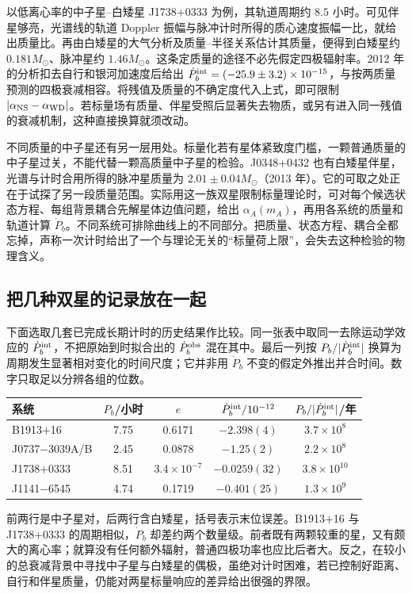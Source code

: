 以低离心率的中子星--白矮星 J1738+0333 为例，其轨道周期约 $8.5$ 小时。可见伴星够亮，光谱线的轨道 Doppler 振幅与脉冲计时所得的质心速度振幅一比，就给出质量比。再由白矮星的大气分析及质量--半径关系估计其质量，便得到白矮星约 $0.181M_\odot$、脉冲星约 $1.46M_\odot$。这条定质量的途径不必先假定四极辐射率。2012 年的分析扣去自行和银河加速度后给出 $\dot P_b^{\rm int}=(-25.9\pm3.2)\times10^{-15}$，与按两质量预测的四极衰减相容。将残值及质量的不确定度代入上式，即可限制 $|\alpha_{\rm NS}-\alpha_{\rm WD}|$。若标量场有质量、伴星受照后显著失去物质，或另有进入同一残值的衰减机制，这种直接换算就须改动。

不同质量的中子星还有另一层用处。标量化若有星体紧致度门槛，一颗普通质量的中子星过关，不能代替一颗高质量中子星的检验。J0348+0432 也有白矮星伴星，光谱与计时合用所得的脉冲星质量为 $2.01\pm0.04M_\odot$（2013 年）。它的可取之处正在于试探了另一段质量范围。实际用这一族双星限制标量理论时，可对每个候选状态方程、每组背景耦合先解星体边值问题，给出 $\alpha_A(m_A)$，再用各系统的质量和轨道计算 $\dot P_b$。不同系统可排除曲线上的不同部分。把质量、状态方程、耦合全都忘掉，声称一次计时给出了一个与理论无关的“标量荷上限”，会失去这种检验的物理含义。

\subsection{把几种双星的记录放在一起}

下面选取几套已完成长期计时的历史结果作比较。同一张表中取同一去除运动学效应的 $\dot P_b^{\rm int}$，不把原始到时拟合出的 $\dot P_b^{\rm obs}$ 混在其中。最后一列按 $P_b/|\dot P_b^{\rm int}|$ 换算为周期发生显著相对变化的时间尺度；它并非用 $\dot P_b$ 不变的假定外推出并合时间。数字只取足以分辨各组的位数。
\begin{center}
{\small
\begin{tabular}{lcccc}
\hline
系统 & $P_b$/小时 & $e$ & $\dot P_b^{\rm int}/10^{-12}$ &
 $P_b/|\dot P_b^{\rm int}|$/年\\ \hline
B1913+16       &7.75&0.6171&$-2.398(4)$ & $3.7\times10^8$\\
J0737$-$3039A/B&2.45&0.0878&$-1.25(2)$  & $2.2\times10^8$\\
J1738+0333     &8.51&$3.4\times10^{-7}$&$-0.0259(32)$&$3.8\times10^{10}$\\
J1141$-$6545   &4.74&0.1719&$-0.401(25)$&$1.3\times10^9$\\ \hline
\end{tabular}}
\end{center}
前两行是中子星对，后两行含白矮星，括号表示末位误差。B1913+16 与 J1738+0333 的周期相似，$\dot P_b$ 却差约两个数量级。前者既有两颗较重的星，又有颇大的离心率；就算没有任何额外辐射，普通四极功率也应比后者大。反之，在较小的总衰减背景中寻找中子星与白矮星的偶极，虽绝对计时困难，若已控制好距离、自行和伴星质量，仍能对两星标量响应的差异给出很强的界限。

